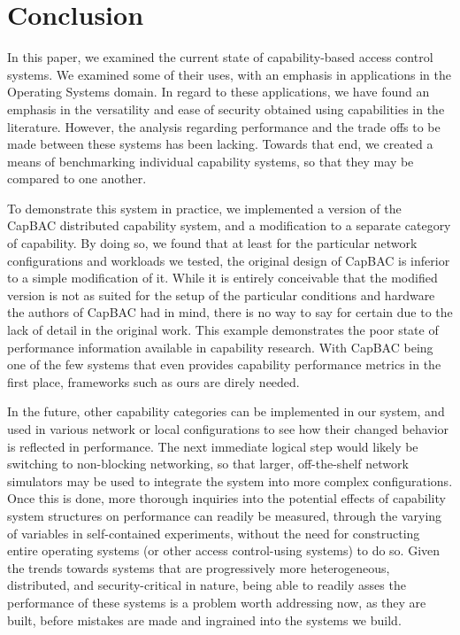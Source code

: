 \section{Conclusion}
\label{sec:conclusion}

In this paper, we examined the current state of capability-based access control systems. We examined some of their uses, with an emphasis in applications in the Operating Systems domain. In regard to these applications, we have found an emphasis in the versatility and ease of security obtained using capabilities in the literature. However, the analysis regarding performance and the trade offs to be made between these systems has been lacking. Towards that end, we created a means of benchmarking individual capability systems, so that they may be compared to one another.

To demonstrate this system in practice, we implemented a version of the CapBAC distributed capability system, and a modification to a separate category of capability. By doing so, we found that at least for the particular network configurations and workloads we tested, the original design of CapBAC is inferior to a simple modification of it. While it is entirely conceivable that the modified version is not as suited for the setup of the particular conditions and hardware the authors of CapBAC had in mind, there is no way to say for certain due to the lack of detail in the original work. This example demonstrates the poor state of performance information available in capability research. With CapBAC being one of the few systems that even provides capability performance metrics in the first place, frameworks such as ours are direly needed.

In the future, other capability categories can be implemented in our system, and used in various network or local configurations to see how their changed behavior is reflected in performance. The next immediate logical step would likely be switching to non-blocking networking, so that larger, off-the-shelf network simulators may be used to integrate the system into more complex configurations. Once this is done, more thorough inquiries into the potential effects of capability system structures on performance can readily be measured, through the varying of variables in self-contained experiments, without the need for constructing entire operating systems (or other access control-using systems) to do so. Given the trends towards systems that are progressively more heterogeneous, distributed, and security-critical in nature, being able to readily asses the performance of these systems is a problem worth addressing now, as they are built, before mistakes are made and ingrained into the systems we build.